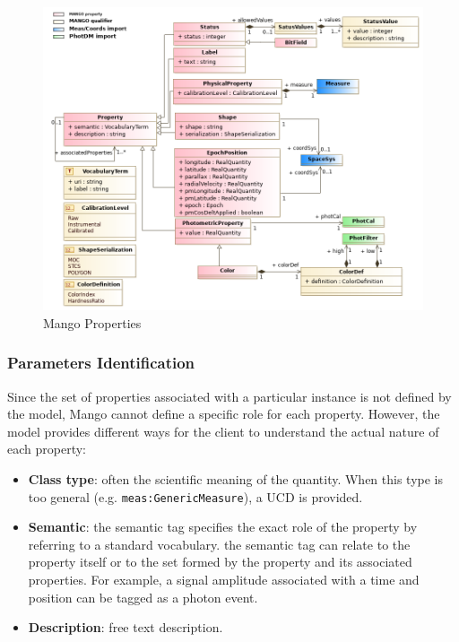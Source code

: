 \documentclass[11pt,a4paper]{ivoa}
\begin{document}
      \begin{figure}[h]
        \includegraphics[width=1.0\textwidth]{../model/property.png}
        \caption{Mango Properties}
        \label{fig:property}
      \end{figure}

\subsubsection{Parameters Identification}
Since the set of properties associated with a particular instance is not defined by the model,
Mango cannot define a specific role for each property. However, the model provides different ways
for the client to understand the actual nature of each property:

\begin{itemize}
    \item \textbf{Class type}: often the scientific meaning of the quantity.
          When this type is too general (e.g. \texttt{meas:GenericMeasure}), a UCD is provided.
    \item \textbf{Semantic}: the semantic tag specifies the exact role of the property by
          referring to a standard vocabulary. the semantic tag can relate to the property itself
          or to the set formed by the property and its associated properties.
          For example, a signal amplitude associated with a time and position can be tagged
          as a photon event.
    \item \textbf{Description}: free text description.
\end{itemize}
\end{document}
